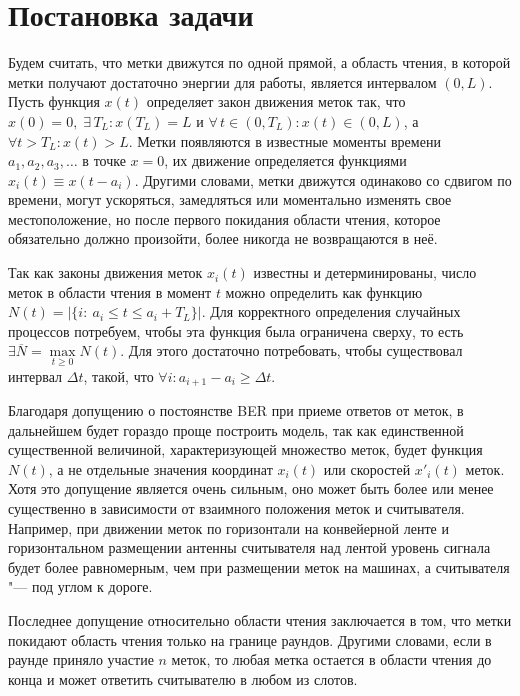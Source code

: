 \section{Постановка задачи}\label{sec:ch3_problem_definition}
Будем считать, что метки движутся по одной прямой, а область чтения, в которой метки получают достаточно энергии для работы, является интервалом $(0, L)$. Пусть функция $x(t)$ определяет закон движения меток так, что $x(0) = 0,\; \exists\,T_L: x(T_L) = L$ и $\forall\, t \in (0, T_L): x(t) \in (0, L)$, а $\forall t > T_L: x(t) > L$. Метки появляются в известные моменты времени $a_1, a_2, a_3, \dots$ в точке $x=0$, их движение определяется функциями $x_i(t) \equiv x(t - a_i)$. Другими словами, метки движутся одинаково со сдвигом по времени, могут ускоряться, замедляться или моментально изменять свое местоположение, но после первого покидания области чтения, которое обязательно должно произойти, более никогда не возвращаются в неё.

Так как законы движения меток $x_i(t)$ известны и детерминированы, число меток в области чтения в момент $t$ можно определить как функцию $N(t) = |\{ i:\: a_i \leqslant t \leqslant a_i + T_L \}|$. Для корректного определения случайных процессов потребуем, чтобы эта функция была ограничена сверху, то есть $\exists \overline{N} = \max\limits_{t \geqslant 0} N(t)$. Для этого достаточно потребовать, чтобы существовал интервал $\Delta t$, такой, что $\forall i: a_{i+1} - a_i \geqslant \Delta t$.

Благодаря допущению о постоянстве BER при приеме ответов от меток, в дальнейшем будет гораздо проще построить модель, так как единственной существенной величиной, характеризующей множество меток, будет функция $N(t)$, а не отдельные значения координат $x_i(t)$ или скоростей $x'_i(t)$ меток. Хотя это допущение является очень сильным, оно может быть более или менее существенно в зависимости от взаимного положения меток и считывателя. Например, при движении меток по горизонтали на конвейерной ленте и горизонтальном размещении антенны считывателя над лентой уровень сигнала будет более равномерным, чем при размещении меток на машинах, а считывателя "--- под углом к дороге.

Последнее допущение относительно области чтения заключается в том, что метки покидают область чтения только на границе раундов. Другими словами, если в раунде приняло участие $n$ меток, то любая метка остается в области чтения до конца и может ответить считывателю в любом из слотов.

